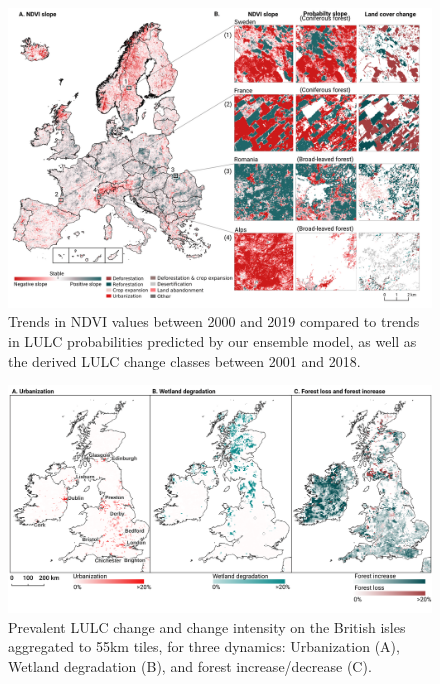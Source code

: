    \begin{landscape}
    \begin{figure}[!hp]
    \vspace*{-1.5cm}
        \hspace*{-3.5cm}
    \centering 
    \includegraphics[width=1\textwidth]{figs_03/results_ndvi_visual.png}
    \caption{Trends in NDVI values between 2000 and 2019 compared to trends in LULC probabilities predicted by our ensemble model, as well as the derived LULC change classes between 2001 and 2018.} \label{fig:ndvi_slope}
    \end{figure}
    \end{landscape}
    
    \begin{landscape}
    \begin{figure}[!hp] 
    \centering 
    \includegraphics[width=1.3\textwidth]{figs_03/results_prevalent_change.png}
    \caption{Prevalent LULC change and change intensity on the British isles aggregated to 5{\texttimes}5km tiles, for three dynamics: Urbanization (A), Wetland degradation (B), and forest increase/decrease (C).} \label{fig:prominent_change}
    \end{figure}
    \end{landscape}

